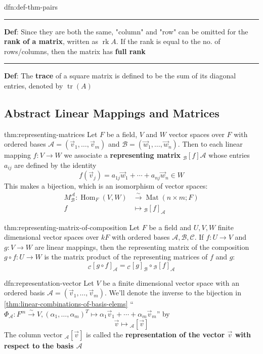 \documentclass[landscape, 8pt]{extarticle}
\DeclareMathOperator{\Mat}{Mat}
\DeclareMathOperator{\Hom}{Hom}
\DeclareMathOperator{\rk}{rk}
\DeclareMathOperator{\Tr}{tr}
\begin{document}
\begin{multicols}{3}
\begin{dfn}{dfn:def-thm-pairs}{}
    \noindent\rule{\textwidth}{0.6pt}
    \textbf{Def}: Since they are both the same, "column" and "row" can be omitted for the \textbf{rank of a matrix}, written as $\rk A$. If the rank is equal to the no. of rows/columns, then the matrix has \textbf{full rank}

    \noindent\rule{\textwidth}{0.6pt}
    \textbf{Def}: The \textbf{trace} of a square matrix is defined to be the sum of its diagonal entries, denoted by $\Tr(A)$
\end{dfn}

\vspace{-5pt}
\subsection{Abstract Linear Mappings and Matrices}

\begin{thm}{thm:representing-matrices}{}
    Let $F$ be a field, $V$ and $W$ vector spaces over $F$ with ordered bases $\mathcal{A} = (\vec{v}_{1},\dots,\vec{v}_{m})$ and $\mathcal{B} = (\vec{w}_{1},\dots,\vec{w}_{n})$. Then to each linear mapping $f : V \to W$ we associate a \textbf{representing matrix} $_{\mathcal{B}}[f]\mathcal{A}$ whose entries $a_{ij}$ are defined by the identity
    \[f(\vec{v}_{j}) = a_{1j}\vec{w}_{1} + \cdots + a_{nj}\vec{w}_{n}\in W\]
    This makes a bijection, which is an isomorphism of vector spaces:
    \begin{align*}
        M^{\mathcal{A}}_{\mathcal{B}} : \Hom_{F}(V, W) &\xrightarrow{\sim} \Mat(n \times m; F) \\
        f &\mapsto {}_{\mathcal{B}}[f]_{\mathcal{A}}
    \end{align*}
\end{thm}

\begin{thm}{thm:representing-matrix-of-composition}{}
    Let $F$ be a field and $U,V,W$ finite dimensional vector spaces over $kF$ with ordered bases $\mathcal{A}, \mathcal{B}, \mathcal{C}$. If $f : U \to V$ and $g : V \to W$ are linear mappings, then the representing matrix of the composition $g \circ f : U \to W$ is the matrix product of the representing matrices of $f$ and $g$:
    \[{}_{\mathcal{C}}[g \circ f]_{\mathcal{A}} = {}_{\mathcal{C}}[g]_{\mathcal{B}} \circ {}_{\mathcal{B}}[f]_{\mathcal{A}}\]
\end{thm}

\begin{dfn}{dfn:representation-vector}{}
    Let $V$ be a finite dimensional vector space with an ordered basis $\mathcal{A} = (\vec{v}_{1},\dots,\vec{v}_{m})$. We'll denote the inverse to the bijection in \ref{thm:linear-combinations-of-basis-elems} ``$\Phi_{\mathcal{A}} : F^{m} \xrightarrow{\sim} V, (\alpha_{1},\dots,\alpha_{m})^{T} \mapsto \alpha_{1}\vec{v}_{1} +\cdots + \alpha_{m}\vec{v}_{m}$'' by
    \[\vec{v} \mapsto {}_{\mathcal{A}}[\vec{v}]\]
    The column vector ${}_{\mathcal{A}}[\vec{v}]$ is called the \textbf{representation of the vector $\vec{v}$ with respect to the basis $\mathcal{A}$}


\end{dfn}
\end{multicols}
\end{document}
